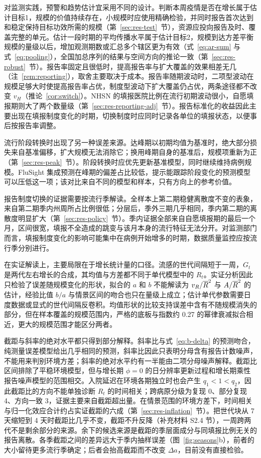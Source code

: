 对监测实践，预警和趋势估计宜采用不同的设计。判断本周疫情是否在增长属于估计目标1，规模的价值持续存在，小规模时应使用精确检验，并同时报告首次达到和稳定保持目标功效所需的规模（第~\ref{sec:res-test}~节），资源应投向报告及时、覆盖完整的单元。估计一段时期的平均传播水平属于估计目标2，规模到达方差平衡规模的量级以后，增加观测期数或汇总多个辖区更为有效（式~\eqref{eq:ar-sum} 与式~\eqref{eq:pooling}），全国加总序列的结果与空间方向的推论一致（第~\ref{sec:res-robust}~节）。报告率固定且很低时，提高报告率与扩大覆盖的效果相差无几（注~\ref{rem:reporting}），取舍主要取决于成本。报告率随期波动时，二项型波动在规模足够大时使提高报告率占优，制度型波动下扩大覆盖仍占优，两条途径都不改变 $v_H$（推论~\ref{cor:switch}）。NHSN 的填报医院比例在流行初期波动很小，自愿填报期则大了两个数量级（第~\ref{sec:res-reporting-adj}~节）。报告标准化的收益因此主要出现在填报制度变化的时期，切换制度时应同时记录各单位的填报状态，以便事后按报告率调整。

流行阶段转换时出现了另一种误差来源。达峰期以初期均值为基准时，绝大部分损失来自基准偏移，扩大规模无法消除它；换用峰期自身的基准后，规模项重新为正（第~\ref{sec:res-peak}~节）。阶段转换时应优先更新基准模型，同时继续维持病例规模。FluSight 集成预测在峰期的偏差占比较低，提示能跟踪阶段变化的预测模型可以压低这一项；该对比来自不同的模型和样本，只有方向上的参考价值。

报告制度切换的证据需要按流行季解读。全样本上第二期稳健离散度不变的表象，来自第二期季内州周所占比例很低；分层后，季外三期几乎相同，季内第二期的离散度明显扩大（第~\ref{sec:res-policy}~节）。季内证据全部来自自愿填报期的最后一个月，区间很宽，填报不全造成的跳变与该月本身的流行特征无法分开。对监测部门而言，填报制度变化的影响可能集中在病例开始增多的时期，数据质量监控应按流行季分别进行。

在实证解读上，主要局限在于增长统计量的口径。流感的世代间隔短于一周，$G_t$ 是两代左右增长的合成，其均值与方差都不同于单代模型中的 $R_t$。实证分析因此只检验了误差随规模变化的形状，拟合的 $a$ 和 $b$ 不能解读为 $v_R/\overline{R}^2$ 与 $A/\overline{R}^2$ 的估计，经验比值 $b/a$ 与情景区间的吻合也只在量级上成立；估计单代参数需要日度数据或显式的世代间隔反卷积。均值形状的比较支持误差中含有不随规模消失的部分，但在样本覆盖的规模范围内，严格的底板与指数约 0.27 的幂律衰减拟合相近，更大的规模范围才能区分两者。

截距与斜率的绝对水平都只得到部分解释。斜率比与式~\eqref{eq:b-delta} 的预测吻合，纯测量误差模型给出几乎相同的预测，斜率比因此只表明分母含有报告计数噪声，不能用来判别环境方差；斜率的绝对水平约有一半能由二项分母噪声解释。截距比区间排除了平稳环境模型，但与增长期 $\phi=0$ 的日分辨率更新过程和增长期乘性报告噪声模型的范围相交。入院延迟在环境各期独立时也会产生 $q_1<1<q_2$，因此截距比的方向不能单独诊断 $R_t$ 的时间相关；跨病原分级为复现 0、部分复现 4、方向一致 3，证据主要来自截距超出量。在情景范围的环境方差下，时间相关与归一化效应合计约占实证截距的六成（第~\ref{sec:res-inflation}~节）。把世代块从 7 天缩短到 4 天时截距比几乎不变，截距不升反降（补充材料 S2.4 节），一周跨两代不是剩余部分的来源。余下的候选来源是截距的季层面成分与同填报比例无关的报告离散。各季截距之间的差异远大于季内抽样误差（图~\ref{fig:seasons}b），前者的大小留待更多流行季确定；后者会抬高截距而不改变 $\Delta a$，目前没有直接检验。

